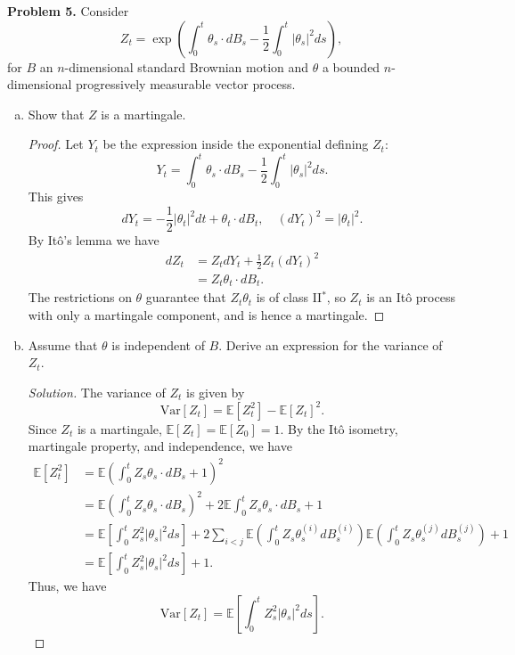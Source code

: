 \documentclass[11pt,letterpaper]{report}
\newcommand{\E}{\mathbb{E}}
\newcommand{\Var}{\text{Var}}
\newenvironment{solution}
{\begin{proof}[Solution]}
{\end{proof}}
\begin{document}
\noindent\textbf{Problem 5. }
Consider
\[
Z_t = \exp\left(\int_0^t\theta_s\cdot dB_s - \frac{1}{2}\int_0^t|\theta_s|^2ds\right),
\]
for $B$ an $n$-dimensional standard Brownian motion and $\theta$ a bounded $n$-dimensional progressively measurable vector process.
\begin{enumerate}[(a)]
	\item Show that $Z$ is a martingale.
	\begin{proof}
		Let $Y_t$ be the expression inside the exponential defining $Z_t$:
		\[
		Y_t = \int_0^t\theta_s\cdot dB_s - \frac{1}{2}\int_0^t|\theta_s|^2ds.
		\]
		This gives
		\[
		dY_t = -\frac{1}{2}|\theta_t|^2dt + \theta_t\cdot dB_t,\quad (dY_t)^2 = |\theta_t|^2.
		\]
		By It\^o's lemma we have
		\begin{align*}
			dZ_t &= Z_tdY_t + \frac{1}{2}Z_t(dY_t)^2\\
			&= Z_t\theta_t\cdot dB_t.
		\end{align*}
		The restrictions on $\theta$ guarantee that $Z_t\theta_t$ is of class II$^*$, so $Z_t$ is an It\^o process with only a martingale component, and is hence a martingale.
	\end{proof}

	\item Assume that $\theta$ is independent of $B$. Derive an expression for the variance of $Z_t$.
	\begin{solution}
	The variance of $Z_t$ is given by
	\[
	\Var[Z_t] = \E[Z_t^2] - \E[Z_t]^2.
	\]
	Since $Z_t$ is a martingale, $\E[Z_t] = \E[Z_0] = 1$. By the It\^o isometry, martingale property, and independence, we have
	\begin{align*}
		\E[Z_t^2] &= \E\left( \int_0^t Z_s\theta_s\cdot dB_s+1\right)^2 \\
		&= \E\left(\int_0^tZ_s\theta_s\cdot dB_s\right)^2 + 2\E\int_0^tZ_s\theta_s\cdot dB_s + 1\\
		&= \E\left[\int_0^tZ_s^2|\theta_s|^2ds\right]+2\sum_{i<j}\E\left(\int_0^tZ_s\theta^{(i)}_sdB^{(i)}_s\right)\E\left(\int_0^tZ_s\theta^{(j)}_sdB^{(j)}_s\right)+1\\
		&= \E\left[\int_0^tZ_s^2|\theta_s|^2ds\right]+1.
	\end{align*}
	Thus, we have
	\[
	\Var[Z_t] = \E\left[\int_0^tZ_s^2|\theta_s|^2ds\right].
	\]
	\end{solution}
\end{enumerate}
\end{document}

